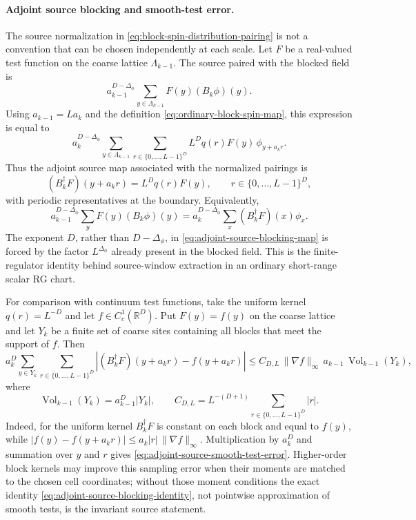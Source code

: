 \paragraph{Adjoint source blocking and smooth-test error.}
The source normalization in
\eqref{eq:block-spin-distribution-pairing} is not a convention that can be
chosen independently at each scale.  Let \(F\) be a real-valued test
function on the coarse lattice \(\Lambda_{k-1}\).  The source paired with
the blocked field is
\[
  a_{k-1}^{D-\Delta_\phi}\sum_{y\in\Lambda_{k-1}}
  F(y)(B_k\phi)(y).
\]
Using \(a_{k-1}=La_k\) and the definition
\eqref{eq:ordinary-block-spin-map}, this expression is equal to
\begin{equation}
  a_k^{D-\Delta_\phi}
  \sum_{y\in\Lambda_{k-1}}
  \sum_{r\in\{0,\ldots,L-1\}^D}
  L^D q(r)F(y)\,\phi_{y+a_kr}.
  \label{eq:adjoint-source-blocking-derivation}
\end{equation}
Thus the adjoint source map associated with the normalized pairings is
\begin{equation}
  (B_k^\dagger F)(y+a_kr)=L^D q(r)F(y),
  \qquad r\in\{0,\ldots,L-1\}^D,
  \label{eq:adjoint-source-blocking-map}
\end{equation}
with periodic representatives at the boundary.  Equivalently,
\begin{equation}
  a_{k-1}^{D-\Delta_\phi}\sum_y F(y)(B_k\phi)(y)
  =
  a_k^{D-\Delta_\phi}\sum_x (B_k^\dagger F)(x)\phi_x .
  \label{eq:adjoint-source-blocking-identity}
\end{equation}
The exponent \(D\), rather than \(D-\Delta_\phi\), in
\eqref{eq:adjoint-source-blocking-map} is forced by the factor
\(L^{\Delta_\phi}\) already present in the blocked field.  This is the
finite-regulator identity behind source-window extraction in an ordinary
short-range scalar RG chart.

For comparison with continuum test functions, take the uniform kernel
\(q(r)=L^{-D}\) and let \(f\in C_c^1(\mathbb R^D)\).  Put \(F(y)=f(y)\) on
the coarse lattice and let \(Y_k\) be a finite set of coarse sites containing
all blocks that meet the support of \(f\).  Then
\begin{equation}
  a_k^D
  \sum_{y\in Y_k}
  \sum_{r\in\{0,\ldots,L-1\}^D}
  \left|(B_k^\dagger F)(y+a_kr)-f(y+a_kr)\right|
  \le
  C_{D,L}\,\|\nabla f\|_\infty\,a_{k-1}\,
  \operatorname{Vol}_{k-1}(Y_k),
  \label{eq:adjoint-source-smooth-test-error}
\end{equation}
where
\[
  \operatorname{Vol}_{k-1}(Y_k)=a_{k-1}^D|Y_k|,
  \qquad
  C_{D,L}=L^{-(D+1)}
  \sum_{r\in\{0,\ldots,L-1\}^D}|r|.
\]
Indeed, for the uniform kernel \(B_k^\dagger F\) is constant on each block
and equal to \(f(y)\), while
\(|f(y)-f(y+a_kr)|\leq a_k|r|\,\|\nabla f\|_\infty\).  Multiplication by
\(a_k^D\) and summation over \(y\) and \(r\) gives
\eqref{eq:adjoint-source-smooth-test-error}.  Higher-order block kernels may
improve this sampling error when their moments are matched to the chosen
cell coordinates; without those moment conditions the exact identity
\eqref{eq:adjoint-source-blocking-identity}, not pointwise approximation of
smooth tests, is the invariant source statement.

